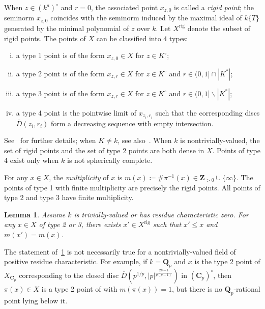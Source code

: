 \documentclass[10pt,reqno]{amsart}
\theoremstyle{plain}
\newtheorem{lemma}[theorem]{Lemma}
\theoremstyle{definition}
\newcommand{\Z}{\mathbf{Z}}
\newcommand{\Q}{\mathbf{Q}}
\newcommand{\C}{\mathbf{C}}
\numberwithin{equation}{section}
\DeclareMathOperator{\rig}{rig}
\begin{document}
When $z \in (k^a)^{\circ}$ and $r = 0$, the associated point $x_{z,0}$ is called a \emph{rigid point}; the seminorm $x_{z,0}$ coincides with the seminorm induced by the maximal ideal of $k\{ T \}$ generated by the minimal polynomial of $z$ over $k$. Let $X^{\rig}$ denote the subset of rigid points. The points of $X$ can be classified into 4 types:
\begin{enumerate}[(i)]
\item a type 1 point is of the form $x_{z,0} \in X$ for $z \in K^{\circ}$;
\item a type 2 point is of the form $x_{z,r} \in X$ for $z \in K^{\circ}$ and $r \in (0,1] \cap |K^*|$;
\item a type 3 point is of the form $x_{z,r} \in X$ for $z \in K^{\circ}$ and $r \in (0,1] \backslash |K^*|$;
\item a type 4 point is the pointwise limit of $x_{z_i,r_i}$ such that the corresponding discs $\overline{D}(z_i,r_i)$ form a decreasing sequence with empty intersection.
\end{enumerate}
See~\cite[p.18]{berkovich} for further details; when $K \not= k$, see also~\cite[Proposition 2.2.7]{kedlaya}.
When $k$ is nontrivially-valued, the set of rigid points and the set of type 2 points are both dense in $X$. Points of type 4 exist only when $k$ is not spherically complete. 

For any $x \in X$, the \emph{multiplicity} of $x$ is $m(x) \coloneqq \# \pi^{-1}(x) \in \Z_{>0} \cup \{ \infty \}$. The points of type 1 with finite multiplicity are precisely the rigid points. All points of type 2 and type 3 have finite multiplicity. 

\begin{lemma}\label{multiplicity_descent}
Assume $k$ is trivially-valued or has residue characteristic zero.
For any $x \in X$ of type 2 or 3, there exists $x' \in X^{\rig}$ such that $x' \leq x$ and $m(x') = m(x)$.
\end{lemma}

The statement of~\cref{multiplicity_descent} is not necessarily true for a nontrivially-valued field of positive residue characteristic. For example, if $k = \Q_p$ and $x$ is the type 2 point of $X_{\C_p}$ corresponding to the closed disc $\overline{D}(p^{1/p},|p|^{\frac{2p-1}{p(p-1)}})$ in $(\C_p)^{\circ}$, then $\pi(x) \in X$ is a type 2 point of with $m(\pi(x)) = 1$, but there is no $\Q_p$-rational point lying below it.
\end{document}
